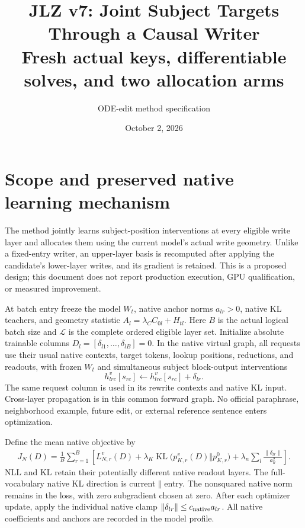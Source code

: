 \documentclass[10pt]{article}
\title{JLZ v7: Joint Subject Targets Through a Causal Writer\\
\large Fresh actual keys, differentiable solves, and two allocation arms}
\author{ODE-edit method specification}
\date{October 2, 2026}
\newcommand{\KL}{\operatorname{KL}}
\newcommand{\norm}[1]{\left\lVert#1\right\rVert}
\begin{document}
\maketitle
\vspace{-1.5em}

\section{Scope and preserved native learning mechanism}
The method jointly learns subject-position interventions at every
eligible write layer and allocates them using the current model's actual
write geometry. Unlike a fixed-entry writer, an upper-layer basis is
recomputed after applying the candidate's lower-layer writes, and its
gradient is retained. This is a proposed design; this document does not
report production execution, GPU qualification, or measured improvement.

At batch entry freeze the model $W_t$, native anchor norms $a_{lr}>0$,
native KL teachers, and geometry statistic $A_l=\lambda_C C_{0l}+H_{tl}$.
Here $B$ is the actual logical batch size and $\mathcal L$ is the complete
ordered eligible layer set. Initialize absolute trainable columns
$D_l=[\delta_{l1},\ldots,\delta_{lB}]=0$. In the native virtual graph,
all requests use their usual native contexts, target tokens, lookup
positions, reductions, and readouts, with frozen $W_t$ and simultaneous
subject block-output interventions
\[
 h^{v}_{lrc}[s_{rc}]\leftarrow h^{v}_{lrc}[s_{rc}]+\delta_{lr}.
\]
The same request column is used in its rewrite contexts and native KL
input. Cross-layer propagation is in this common forward graph. No
official paraphrase, neighborhood example, future edit, or external
reference sentence enters optimization.

Define the mean native objective by
\begin{align}
 J_N(D)=\frac1B\sum_{r=1}^{B}\left[
 L^{v}_{N,r}(D)
 +\lambda_K\KL\bigl(p^v_{K,r}(D)\Vert p^0_{K,r}\bigr)
 +\lambda_n\sum_l\frac{\norm{\delta_{lr}}}{a_{lr}^2}\right].
 \label{eq:native}
\end{align}
NLL and KL retain their potentially different native readout layers.
The full-vocabulary native KL direction is current $\Vert$ entry.
The nonsquared native norm remains in the loss, with zero subgradient
chosen at zero. After each optimizer update, apply the individual native
clamp $\norm{\delta_{lr}}\leq c_{\rm native}a_{lr}$. All native
coefficients and anchors are recorded in the model profile.
\end{document}
